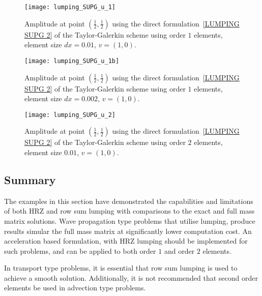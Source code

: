 \begin{figure}[ht]
\centerline{\texttt{[image: lumping\_SUPG\_u\_1]}}
\caption{Amplitude at point $(\frac{1}{2},\frac{1}{2})$ using the direct formulation~\ref{LUMPING SUPG 2} of the 
Taylor-Galerkin scheme using order $1$ elements, element size $dx=0.01$, $v=(1,0)$.}
\label{FIG LUMPING SUPG A}
\end{figure}

\begin{figure}[ht]
\centerline{\texttt{[image: lumping\_SUPG\_u\_1b]}}
\caption{Amplitude at point $(\frac{1}{2},\frac{1}{2})$ using the direct formulation~\ref{LUMPING SUPG 2} of the 
Taylor-Galerkin scheme using order $1$ elements, element size $dx=0.002$, $v=(1,0)$.}
\label{FIG LUMPING SUPG Ab}
\end{figure}

\begin{figure}[ht]
\centerline{\texttt{[image: lumping\_SUPG\_u\_2]}}
\caption{Amplitude at point $(\frac{1}{2},\frac{1}{2})$ using the direct formulation~\ref{LUMPING SUPG 2} of the 
Taylor-Galerkin scheme  using order $2$ elements, element size $0.01$, $v=(1,0)$.}
\label{FIG LUMPING SUPG B}
\end{figure}

\subsection{Summary}
The examples in this section have demonstrated the capabilities and limitations
of both HRZ and row sum lumping with comparisons to the exact and full mass 
matrix solutions. Wave propagation type problems that utilise lumping, produce 
results simular the full mass matrix at significantly 
lower computation cost. An acceleration based formulation, with HRZ lumping 
should be implemented for such problems, and can be applied to both order $1$ and
 order $2$ elements. 

In transport type problems, it is essential that row sum lumping is used to 
achieve a smooth solution. Additionally, it is not recommended that second order
elements be used in advection type problems.



